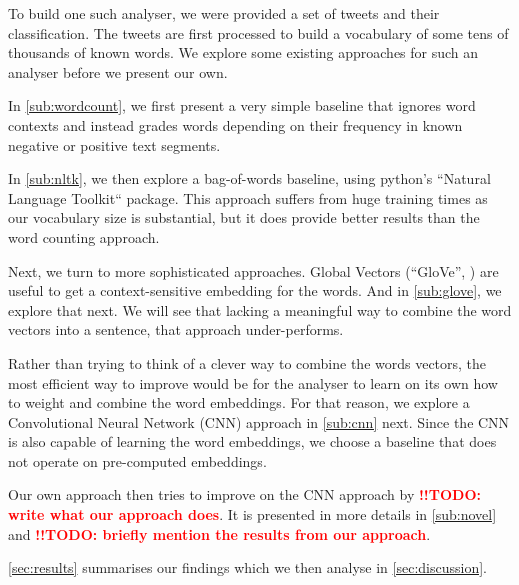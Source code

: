 \documentclass[10pt,conference,compsocconf]{IEEEtran}
\newcommand{\todoThis}[1]{\textcolor{red}{\textbf{!!TODO: #1}}}
\begin{document}
To build one such analyser, we were provided a set of tweets and their classification. The tweets are first processed to build a vocabulary of some tens of thousands of known words. We explore some existing approaches for such an analyser before we present our own.

In \autoref{sub:wordcount}, we first present a very simple baseline that ignores word contexts and instead grades words depending on their frequency in known negative or positive text segments.

In \autoref{sub:nltk}, we then explore a bag-of-words baseline, using python's ``Natural Language Toolkit`` package. This approach suffers from huge training times as our vocabulary size is substantial, but it does provide better results than the word counting approach.

Next, we turn to more sophisticated approaches.
Global Vectors (``GloVe'', \cite{glove_paper}) are useful to get a context-sensitive embedding for the words. And in \autoref{sub:glove}, we explore that next.
We will see that lacking a meaningful way to combine the word vectors into a sentence, that approach under-performs.

Rather than trying to think of a clever way to combine the words vectors, the most efficient way to improve would be for the analyser to learn on its own how to weight and combine the word embeddings. For that reason, we explore a Convolutional Neural Network (CNN) approach in \autoref{sub:cnn} next. Since the CNN is also capable of learning the word embeddings, we choose a baseline that does not operate on pre-computed embeddings.

Our own approach then tries to improve on the CNN approach by \todoThis{write what our approach does}. It is presented in more details in \autoref{sub:novel} and \todoThis{briefly mention the results from our approach}.

\autoref{sec:results} summarises our findings which we then analyse in \autoref{sec:discussion}.
  
\end{document}
